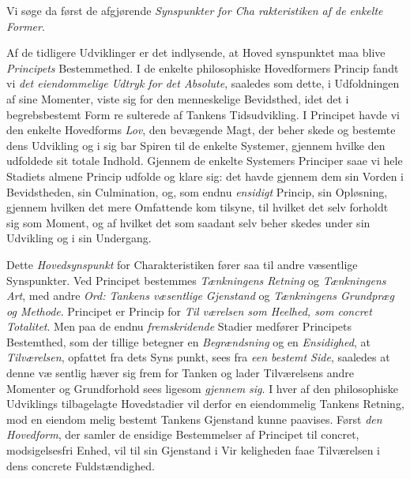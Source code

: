 Vi søge da først de afgjørende \emph{Synspunkter for Cha\-%
rakteristiken af de enkelte Former}.

Af de tidligere Udviklinger er det indlysende, at Hoved\-%
synspunktet maa blive \emph{Principets} Bestemmethed. I de
enkelte philosophiske Hovedformers Princip fandt vi \emph{det
eiendommelige Udtryk for det Absolute}, saaledes som
dette, i Udfoldningen af sine Momenter, viste sig for den
menneskelige Bevidsthed, idet det i begrebsbestemt Form re\-%
sulterede af Tankens Tidsudvikling. I Principet havde vi den
enkelte Hovedforms \emph{Lov}, den bevægende Magt, der beher\-%
skede og bestemte dens Udvikling og i sig bar Spiren til de
enkelte Systemer, gjennem hvilke den udfoldede sit totale
Indhold. Gjennem de enkelte Systemers Principer saae vi
hele Stadiets almene Princip udfolde og klare sig: det havde
gjennem dem sin Vorden i Bevidstheden, sin Culmination, og,
som endnu \emph{ensidigt} Princip, sin Opløsning, gjennem hvilken
det mere Omfattende kom tilsyne, til hvilket det selv forholdt
sig som Moment, og af hvilket det som saadant selv beher\-%
skedes under sin Udvikling og i sin Undergang.

Dette \emph{Hovedsynspunkt} for Charakteristiken fører saa
til andre væsentlige Synspunkter. Ved Principet bestemmes
\emph{Tænkningens Retning} og \emph{Tænkningens Art}, med andre
\emph{Ord: Tankens væsentlige Gjenstand} og \emph{Tænkningens
Grundpræg og Methode}. Principet er Princip for \emph{Til\-%
værelsen som Heelhed, som concret Totalitet}. Men
paa de endnu \emph{fremskridende} Stadier medfører Principets
Bestemthed, som der tillige betegner en \emph{Begrændsning} og
en \emph{Ensidighed}, at \emph{Tilværelsen}, opfattet fra dets Syns\-%
punkt, sees fra \emph{een bestemt Side}, saaledes at denne væ\-%
sentlig hæver sig frem for Tanken og lader Tilværelsens andre
Momenter og Grundforhold sees ligesom \emph{gjennem sig}. I
hver af den philosophiske Udviklings tilbagelagte Hovedstadier
vil derfor en eiendommelig Tankens Retning, mod en eiendom\-%
melig bestemt Tankens Gjenstand kunne paavises. Først \emph{den
Hovedform}, der samler de ensidige Bestemmelser af Principet
til concret, modsigelsesfri Enhed, vil til sin Gjenstand i Vir\-%
keligheden faae Tilværelsen i dens concrete Fuldstændighed.

